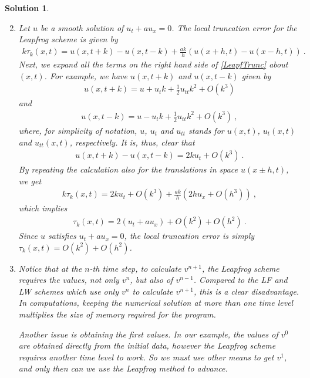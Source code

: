 \documentclass[10pt,letterpaper]{article}
\newcommand{\rb}[1]{ \left(  {#1} \right) }
\newcommand{\frb}[1]{ \left(  {#1} \right) }
\theoremstyle{break}
\newtheorem{mysolution}{Solution}
\newenvironment{solution}{\begin{mysolution}}{\end{mysolution}}
\begin{document}
\begin{solution}
	\begin{enumerate}\setcounter{enumii}{1}
		\item
		Let $u$ be a smooth solution of $u_t+au_x=0$. The local truncation error for the Leapfrog scheme is given by 
		\begin{gather} \label{LeapfTrunc}
			k\tau_k(x,t)=u\frb{x,t+k}-u\frb{x,t-k}+\frac{ak}{h}\rb{u\frb{x+h,t}-u\frb{x-h,t}}\ . 
		\end{gather}
		Next, we expand all the terms on the right hand side of \eqref{LeapfTrunc} about $(x,t)$. For example, we have $u\frb{x,t+k}$ and $u\frb{x,t-k}$ given by 
		\begin{gather}
			u\frb{x,t+k}=u +u_tk +\frac{1}{2}u_{tt}k^2+O\frb{k^3} 
		\end{gather}
		and
		\begin{gather}
			u\frb{x,t-k}=u -u_tk +\frac{1}{2}u_{tt}k^2+O\frb{k^3}\ , 
		\end{gather}
		where, for simplicity of notation, $u$, $u_t$ and $u_{tt}$ stands for $u(x,t)$, $u_t(x,t)$ and $u_{tt}(x,t)$, respectively. It is, thus, clear that 
		\begin{gather}
			u\frb{x,t+k}-u\frb{x,t-k}=2ku_t+O\frb{k^3}\ .
		\end{gather}
		By repeating the calculation also for the translations in space $u(x\pm h,t)$, we get 
		\begin{gather}
			k\tau_k(x,t)=2ku_t+O\frb{k^3} +\frac{ak}{h}\rb{2hu_x+O\frb{h^3}}\ , 
		\end{gather}
		which implies 
		\begin{gather}
			\tau_k(x,t)=2\rb{u_t+au_x}+O\frb{k^2}+O\frb{h^2}\ . 
		\end{gather}
		Since $u$ satisfies $u_t+au_x=0$, the local truncation error is simply $\tau_k(x,t)=O\frb{k^2}+O\frb{h^2}$. 
	
		\item
		Notice that at the $n$-th time step, to calculate $v^{n+1}$, the Leapfrog scheme requires the values, not only $v^n$, but also of $v^{n-1}$.
		Compared to the LF and LW schemes which use only $v^n$ to calculate $v^{n+1}$, this is a clear disadvantage. In computations, keeping the numerical solution at more than one time level multiplies the size of memory required for the program.
	
		Another issue is obtaining the first values. In our example, the values of $v^0$ are obtained directly from the initial data, however the Leapfrog scheme requires another time level to work.
		So we must use other means to get $v^1$, and only then can we use the Leapfrog method to advance.
	\end{enumerate}
\end{solution}
\end{document}
